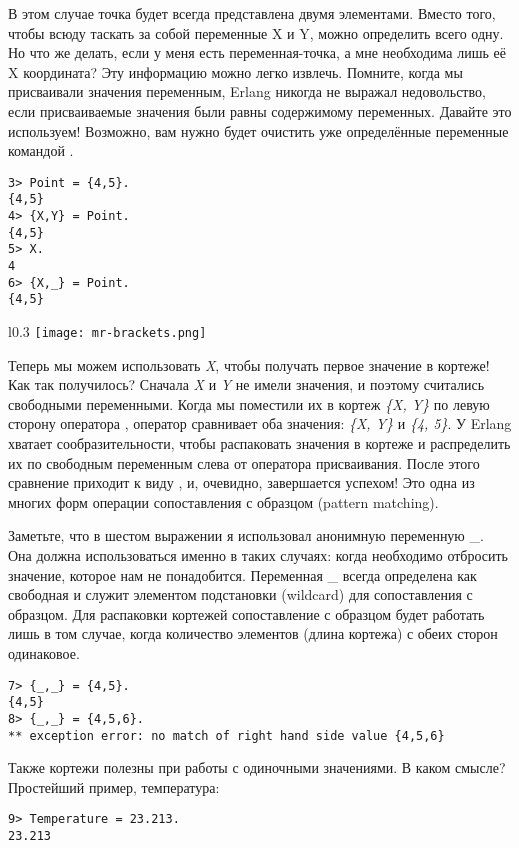 В этом случае точка будет всегда представлена двумя элементами. Вместо того, чтобы всюду таскать за собой переменные X и Y, можно определить всего одну. Но что же делать, если у меня есть переменная\--точка, а мне необходима лишь её X координата? Эту информацию можно легко извлечь. Помните, когда мы присваивали значения переменным, Erlang никогда не выражал недовольство, если присваиваемые значения были равны содержимому переменных. Давайте это используем! Возможно, вам нужно будет очистить уже определённые переменные командой .
\begin{lstlisting}[style=repl]
3> Point = {4,5}.
{4,5}
4> {X,Y} = Point.
{4,5}
5> X.
4
6> {X,_} = Point.
{4,5}
\end{lstlisting}
\begin{wrapfigure}{l}{0.3\textwidth}
    \texttt{[image: mr-brackets.png]}
\end{wrapfigure}

Теперь мы можем использовать \emph{X}, чтобы получать первое значение в кортеже! Как так получилось? Сначала \emph{X} и \emph{Y} не имели значения, и поэтому считались свободными переменными. Когда мы поместили их в кортеж \emph{\{X, Y\}} по левую сторону оператора \ops{=}, оператор \ops{=} сравнивает оба значения: \emph{\{X, Y\}} и \emph{\{4, 5\}}. У Erlang хватает сообразительности, чтобы распаковать значения в кортеже и распределить их по свободным переменным слева от оператора присваивания. После этого сравнение приходит к виду , и, очевидно, завершается успехом! Это одна из многих форм операции сопоставления с образцом (pattern matching).

Заметьте, что в шестом выражении я использовал анонимную переменную \_. Она должна использоваться именно в таких случаях: когда необходимо отбросить значение, которое нам не понадобится. Переменная \_ всегда определена как свободная и служит элементом подстановки (wildcard) для сопоставления с образцом. Для распаковки кортежей сопоставление с образцом будет работать лишь в том случае, когда количество элементов (длина кортежа) с обеих сторон одинаковое.
\begin{lstlisting}[style=repl]
7> {_,_} = {4,5}.
{4,5}
8> {_,_} = {4,5,6}.
** exception error: no match of right hand side value {4,5,6}
\end{lstlisting}

Также кортежи полезны при работы с одиночными значениями. В каком смысле? Простейший пример, температура:
\begin{lstlisting}[style=repl]
9> Temperature = 23.213.
23.213
\end{lstlisting}

